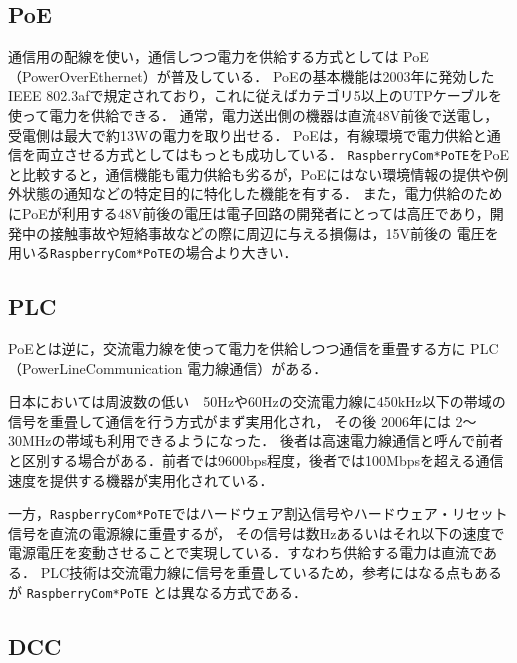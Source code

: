 {%


\subsection{PoE}

通信用の配線を使い，通信しつつ電力を供給する方式としては PoE（PowerOverEthernet）が普及している．
PoEの基本機能は2003年に発効したIEEE 802.3afで規定されており，これに従えばカテゴリ5以上のUTPケーブルを使って電力を供給できる．
通常，電力送出側の機器は直流48V前後で送電し，受電側は最大で約13Wの電力を取り出せる．
PoEは，有線環境で電力供給と通信を両立させる方式としてはもっとも成功している．
{\tt Raspberry\-Com*PoTE}をPoEと比較すると，通信機能も電力供給も劣るが，PoEにはない環境情報の提供や例外状態の通知などの特定目的に特化した機能を有する．
また，電力供給のためにPoEが利用する48V前後の電圧は電子回路の開発者にとっては高圧であり，開発中の接触事故や短絡事故などの際に周辺に与える損傷は，15V前後の
電圧を用いる{\tt Raspberry\-Com*PoTE}の場合より大きい．


\subsection{PLC}

PoEとは逆に，交流電力線を使って電力を供給しつつ通信を重畳する方に PLC（PowerLineCommunication 電力線通信）がある．


日本においては周波数の低い　50Hzや60Hzの交流電力線に450kHz以下の帯域の信号を重畳して通信を行う方式がまず実用化され，
その後 2006年には 2〜30MHzの帯域も利用できるようになった．
後者は高速電力線通信と呼んで前者と区別する場合がある．前者では9600bps程度，後者では100Mbpsを超える通信速度を提供する機器が実用化されている．

一方，{\tt Raspberry\-Com*PoTE}ではハードウェア割込信号やハードウェア・リセット信号を直流の電源線に重畳するが，
その信号は数Hzあるいはそれ以下の速度で電源電圧を変動させることで実現している．すなわち供給する電力は直流である．
PLC技術は交流電力線に信号を重畳しているため，参考にはなる点もあるが {\tt Raspberry\-Com*PoTE} とは異なる方式である．


\subsection{DCC}

}
